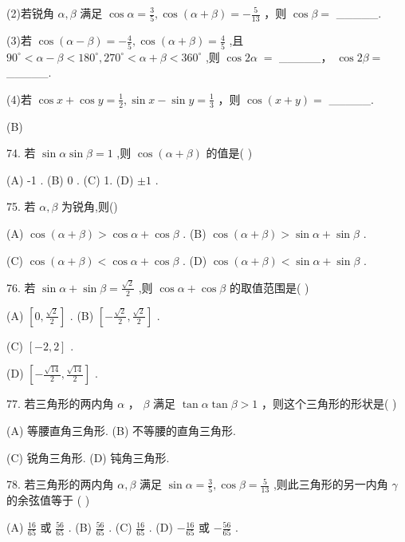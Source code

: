 \documentclass[10pt]{article}
\begin{document}
(2)若锐角 \(\alpha ,\beta\) 满足 \(\cos \alpha  = \frac{3}{5},\cos \left( {\alpha  + \beta }\right)  =  - \frac{5}{13}\) ，则 \(\cos \beta  =\) \_\_\_\_\_.

(3)若 \(\cos \left( {\alpha  - \beta }\right)  =  - \frac{4}{5},\cos \left( {\alpha  + \beta }\right)  = \frac{4}{5}\) ,且 \({90}^{ \circ  } < \alpha  - \beta  < {180}^{ \circ  },{270}^{ \circ  } < \alpha  + \beta  < {360}^{ \circ  }\) ,则 \(\cos {2\alpha } \; =\) \_\_\_\_\_， \(\cos {2\beta } =\) \_\_\_\_\_.

(4)若 \(\cos x + \cos y = \frac{1}{2},\sin x - \sin y = \frac{1}{3}\) ，则 \(\cos \left( {x + y}\right)  =\) \_\_\_\_\_.

(B)

74. 若 \(\sin \alpha \sin \beta  = 1\) ,则 \(\cos \left( {\alpha  + \beta }\right)\) 的值是( )

(A) -1 . (B) 0 . (C) 1. (D) \(\pm  1\) .

75. 若 \(\alpha ,\beta\) 为锐角,则()

(A) \(\cos \left( {\alpha  + \beta }\right)  > \cos \alpha  + \cos \beta\) . (B) \(\cos \left( {\alpha  + \beta }\right)  > \sin \alpha  + \sin \beta\) .

(C) \(\cos \left( {\alpha  + \beta }\right)  < \cos \alpha  + \cos \beta\) . (D) \(\cos \left( {\alpha  + \beta }\right)  < \sin \alpha  + \sin \beta\) .

76. 若 \(\sin \alpha  + \sin \beta  = \frac{\sqrt{2}}{2}\) ,则 \(\cos \alpha  + \cos \beta\) 的取值范围是( )

(A) \(\left\lbrack  {0,\frac{\sqrt{2}}{2}}\right\rbrack\) . (B) \(\left\lbrack  {-\frac{\sqrt{2}}{2},\frac{\sqrt{2}}{2}}\right\rbrack\) .

(C) \(\left\lbrack  {-2,2}\right\rbrack\) .

(D) \(\left\lbrack  {-\frac{\sqrt{14}}{2},\frac{\sqrt{14}}{2}}\right\rbrack\) .

77. 若三角形的两内角 \(\alpha\) ， \(\beta\) 满足 \(\tan \alpha \tan \beta  > 1\) ，则这个三角形的形状是( )

(A) 等腰直角三角形. (B) 不等腰的直角三角形.

(C) 锐角三角形. (D) 钝角三角形.

78. 若三角形的两内角 \(\alpha ,\beta\) 满足 \(\sin \alpha  = \frac{3}{5},\cos \beta  = \frac{5}{13}\) ,则此三角形的另一内角 \(\gamma\) 的余弦值等于 ( )

(A) \(\frac{16}{65}\) 或 \(\frac{56}{65}\) . (B) \(\frac{56}{65}\) . (C) \(\frac{16}{65}\) . (D) \(- \frac{16}{65}\) 或 \(- \frac{56}{65}\) .
\end{document}

